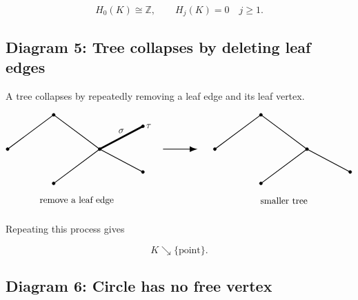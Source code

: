 \documentclass[12pt,a4paper]{article}
\theoremstyle{notespace}
\begin{document}
\[
H_0(K)\cong \mathbb Z,
\qquad
H_j(K)=0
\quad
j\geq 1.
\]

\subsection{Diagram 5: Tree collapses by deleting leaf edges}

A tree collapses by repeatedly removing a leaf edge and its leaf vertex.

\[
\begin{tikzpicture}[scale=1.1]
	\coordinate (A) at (0,0);
	\coordinate (B) at (1.6,1.2);
	\coordinate (C) at (3.2,0);
	\coordinate (D) at (1.6,-1.2);
	\coordinate (E) at (4.7,0.8);
	\coordinate (F) at (4.7,-0.8);
	
	\draw[thick] (A)--(B)--(C)--(D);
	\draw[thick] (C)--(E);
	\draw[thick] (C)--(F);
	
	\filldraw (A) circle (1.5pt);
	\filldraw (B) circle (1.5pt);
	\filldraw (C) circle (1.5pt);
	\filldraw (D) circle (1.5pt);
	\filldraw (E) circle (1.5pt);
	\filldraw (F) circle (1.5pt);
	
	\draw[line width=2pt] (C)--(E);
	\node[right] at (E) {$\tau$};
	\node[above] at (3.95,0.45) {$\sigma$};
	
	\node at (2.4,-1.8) {remove a leaf edge};
	
	\draw[-{Latex[length=3mm]},thick] (5.4,0)--(6.6,0);
	
	\begin{scope}[xshift=7.2cm]
		\coordinate (A) at (0,0);
		\coordinate (B) at (1.6,1.2);
		\coordinate (C) at (3.2,0);
		\coordinate (D) at (1.6,-1.2);
		\coordinate (F) at (4.7,-0.8);
		
		\draw[thick] (A)--(B)--(C)--(D);
		\draw[thick] (C)--(F);
		
		\filldraw (A) circle (1.5pt);
		\filldraw (B) circle (1.5pt);
		\filldraw (C) circle (1.5pt);
		\filldraw (D) circle (1.5pt);
		\filldraw (F) circle (1.5pt);
		
		\node at (2.4,-1.8) {smaller tree};
	\end{scope}
\end{tikzpicture}
\]

Repeating this process gives

\[
K\searrow \{\text{point}\}.
\]

\subsection{Diagram 6: Circle has no free vertex}
\end{document}
